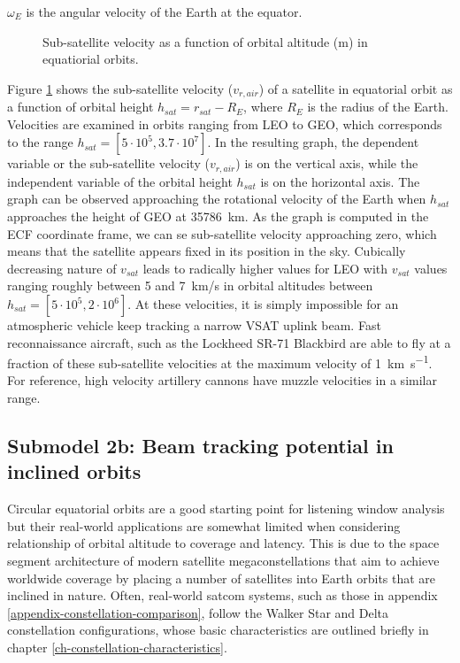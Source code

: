 \documentclass[english, 12pt, a4paper, elec, utf8, a-1b, online]{aaltothesis}
\begin{document}
\noindent
$\omega_E$ is the angular velocity of the Earth at the equator.

\begin{figure}[h]
  \centering
  
  \caption{Sub-satellite velocity as a function of orbital altitude (m) in equatiorial orbits.}
  \label{fig-subsat-velocity-equatiorial}
\end{figure}

Figure \ref{fig-subsat-velocity-equatiorial} shows the sub-satellite velocity ($v_{r, air}$) of a satellite in equatorial orbit as a function of orbital height $h_{sat} = r_{sat} - R_{E}$, where $R_{E}$ is the radius of the Earth.
Velocities are examined in orbits ranging from LEO to GEO, which corresponds to the range $h_{sat} = [5 \cdot 10^5, 3.7 \cdot 10^7]$.
In the resulting graph, the dependent variable or the sub-satellite velocity ($v_{r, air}$) is on the vertical axis, while the independent variable of the orbital height $h_{sat}$ is on the horizontal axis.
The graph can be observed approaching the rotational velocity of the Earth when $h_{sat}$ approaches the height of GEO at \SI{35786}{\kilo\meter}.
As the graph is computed in the ECF coordinate frame, we can se sub-satellite velocity approaching zero, which means that the satellite appears fixed in its position in the sky.
Cubically decreasing nature of $v_{sat}$ leads to radically higher values for LEO with $v_{sat}$ values ranging roughly between 5 and 7\ km/s in orbital altitudes between $h_{sat} = [5 \cdot 10^5, 2 \cdot 10^6]$.
At these velocities, it is simply impossible for an atmospheric vehicle keep tracking a narrow VSAT uplink beam.
Fast reconnaissance aircraft, such as the Lockheed SR-71 Blackbird are able to fly at a fraction of these sub-satellite velocities at the maximum velocity of \SI{1}{\kilo\meter\per\second}.
For reference, high velocity artillery cannons have muzzle velocities in a similar range.

\subsection{Submodel 2b: Beam tracking potential in inclined orbits} \label{ch-results-submodel-2b-tracking-inclined}

Circular equatorial orbits are a good starting point for listening window analysis but their real-world applications are somewhat limited when considering relationship of orbital altitude to coverage and latency.
This is due to the space segment architecture of modern satellite megaconstellations that aim to achieve worldwide coverage by placing a number of satellites into Earth orbits that are inclined in nature.
Often, real-world satcom systems, such as those in appendix \ref{appendix-constellation-comparison}, follow the Walker Star and Delta constellation configurations, whose basic characteristics are outlined briefly in chapter \ref{ch-constellation-characteristics}.
\end{document}
